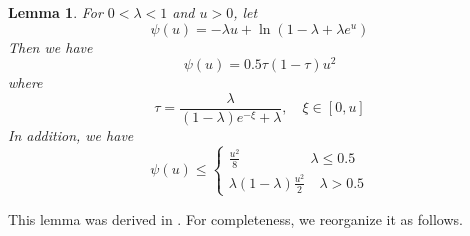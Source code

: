 \documentclass[journal]{IEEEtran}
\newtheorem{lem}{Lemma}
\begin{document}
\begin{lem}\label{lemma3}
For $0<\lambda<1$ and $u>0$, let
\begin{equation}
  \psi(u)=-\lambda u+\ln(1-\lambda+\lambda e^u)
\end{equation}
Then we have
\begin{equation}
  \psi (u) =0.5\tau (1-\tau)u^2
\end{equation}
where
\begin{equation}
  \tau =\frac{\lambda}{(1-\lambda)e^{-\xi}+\lambda}, \quad \xi\in[0,u]
\end{equation}
In addition, we have
\begin{equation}
\psi (u) \leq \begin{cases} \frac{u^2}{8}\quad \quad \quad \quad \quad \lambda \leq 0.5 \\
\lambda (1-\lambda) \frac{u^2}{2} \quad \lambda >0.5
\end{cases}
\end{equation}
\end{lem}
This lemma was derived in \cite{r1}. For completeness, we reorganize it as follows.
\end{document}
